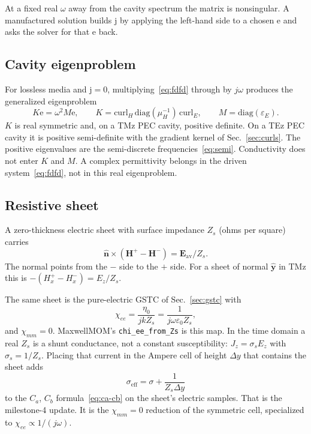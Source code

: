 \documentclass[11pt,a4paper]{article}
\numberwithin{equation}{section}
\begin{document}
At a fixed real $\omega$ away from the cavity spectrum the matrix is
nonsingular. A manufactured solution builds $\mathrm{j}$ by applying the
left-hand side to a chosen $\mathrm{e}$ and asks the solver for that
$\mathrm{e}$ back.

\subsection{Cavity eigenproblem}
\label{sec:eigen}

For lossless media and $\mathrm{j}=0$, multiplying~\eqref{eq:fdfd} through by
$j\omega$ produces the generalized eigenproblem
\begin{equation}
K\mathrm{e} = \omega^2 M\mathrm{e},
\qquad
K = \mathrm{curl}_H\,\mathrm{diag}(\mu_H^{-1})\,\mathrm{curl}_E,
\qquad
M = \mathrm{diag}(\varepsilon_E).
\label{eq:eigen}
\end{equation}
$K$ is real symmetric and, on a TMz PEC cavity, positive definite. On a TEz
PEC cavity it is positive semi-definite with the gradient kernel of
Sec.~\ref{sec:curls}. The positive eigenvalues are the semi-discrete
frequencies~\eqref{eq:semi}. Conductivity does not enter $K$ and $M$. A
complex permittivity belongs in the driven system~\eqref{eq:fdfd}, not in
this real eigenproblem.

\subsection{Resistive sheet}
\label{sec:impedance}

A zero-thickness electric sheet with surface impedance $Z_s$ (ohms per
square) carries
\begin{equation}
\hat{\mathbf{n}}\times(\mathbf{H}^+-\mathbf{H}^-) = \mathbf{E}_{\mathrm{av}}/Z_s.
\label{eq:zs}
\end{equation}
The normal points from the $-$ side to the $+$ side. For a sheet of normal
$\hat{\mathbf{y}}$ in TMz this is $-(H_x^+-H_x^-)=E_z/Z_s$.

The same sheet is the pure-electric GSTC of Sec.~\ref{sec:gstc} with
\begin{equation}
\chi_{ee} = \frac{\eta_0}{j k Z_s} = \frac{1}{j\omega\varepsilon_0 Z_s},
\label{eq:chi-from-z}
\end{equation}
and $\chi_{mm}=0$. MaxwellMOM's \texttt{chi\_ee\_from\_Zs} is this map. In the
time domain a real $Z_s$ is a shunt conductance, not a constant
susceptibility: $J_z=\sigma_s E_z$ with $\sigma_s=1/Z_s$. Placing that current
in the Ampere cell of height $\Delta y$ that contains the sheet adds
\begin{equation}
\sigma_{\mathrm{eff}} = \sigma + \frac{1}{Z_s\Delta y}
\label{eq:sigma-sheet}
\end{equation}
to the $C_a$, $C_b$ formula~\eqref{eq:ca-cb} on the sheet's electric samples.
That is the milestone-4 update. It is the $\chi_{mm}=0$ reduction of the
symmetric cell, specialized to $\chi_{ee}\propto 1/(j\omega)$.
\end{document}
